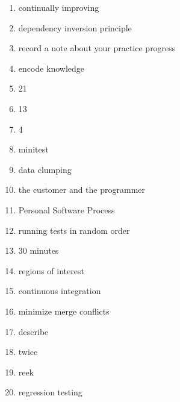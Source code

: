 \documentclass{exam}
\begin{document}
\begin{enumerate}
\item continually improving
\item dependency inversion principle
\item record a note about your practice progress
\item encode knowledge
\item 21
\item 13
\item 4
\item minitest
\item data clumping
\item the customer and the programmer
\item Personal Software Process
\item running tests in random order
\item 30 minutes
\item regions of interest
\item continuous integration
\item minimize merge conflicts
\item describe
\item twice
\item reek
\item regression testing
\end{enumerate}
\end{document}

